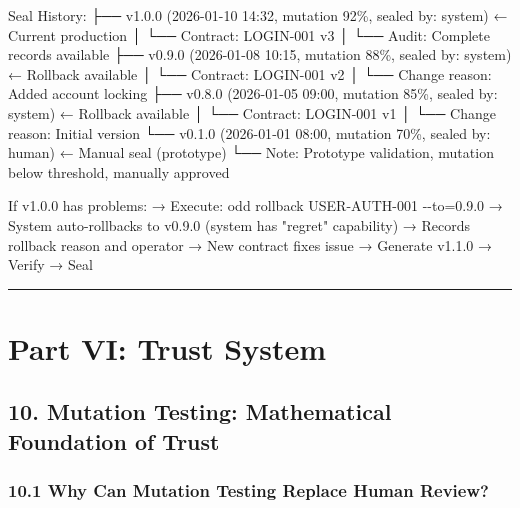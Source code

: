 \documentclass[
]{article}
\newenvironment{Shaded}{}{}
\newcommand{\NormalTok}[1]{#1}
\begin{document}
\begin{Shaded}
\begin{Highlighting}[]
\NormalTok{Seal History:}
\NormalTok{├── v1.0.0 (2026{-}01{-}10 14:32, mutation 92\%, sealed by: system)  ← Current production}
\NormalTok{│   └── Contract: LOGIN{-}001 v3}
\NormalTok{│   └── Audit: Complete records available}
\NormalTok{├── v0.9.0 (2026{-}01{-}08 10:15, mutation 88\%, sealed by: system)  ← Rollback available}
\NormalTok{│   └── Contract: LOGIN{-}001 v2}
\NormalTok{│   └── Change reason: Added account locking}
\NormalTok{├── v0.8.0 (2026{-}01{-}05 09:00, mutation 85\%, sealed by: system)  ← Rollback available}
\NormalTok{│   └── Contract: LOGIN{-}001 v1}
\NormalTok{│   └── Change reason: Initial version}
\NormalTok{└── v0.1.0 (2026{-}01{-}01 08:00, mutation 70\%, sealed by: human)   ← Manual seal (prototype)}
\NormalTok{    └── Note: Prototype validation, mutation below threshold, manually approved}

\NormalTok{If v1.0.0 has problems:}
\NormalTok{  → Execute: odd rollback USER{-}AUTH{-}001 {-}{-}to=0.9.0}
\NormalTok{  → System auto{-}rollbacks to v0.9.0 (system has "regret" capability)}
\NormalTok{  → Records rollback reason and operator}
\NormalTok{  → New contract fixes issue → Generate v1.1.0 → Verify → Seal}
\end{Highlighting}
\end{Shaded}

\begin{center}\rule{0.5\linewidth}{0.5pt}\end{center}

\hypertarget{part-vi-trust-system}{%
\section{Part VI: Trust System}\label{part-vi-trust-system}}

\hypertarget{10-mutation-testing-mathematical-foundation-of-trust}{%
\subsection{10. Mutation Testing: Mathematical Foundation of
Trust}\label{10-mutation-testing-mathematical-foundation-of-trust}}

\hypertarget{101-why-can-mutation-testing-replace-human-review}{%
\subsubsection{10.1 Why Can Mutation Testing Replace Human
Review?}\label{101-why-can-mutation-testing-replace-human-review}}
\end{document}
